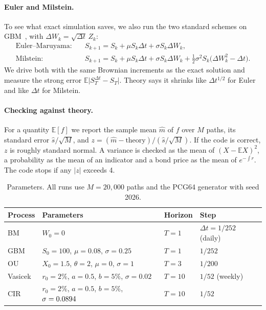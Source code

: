 \documentclass[11pt]{article}
\newcommand{\E}{\mathbb{E}}
\begin{document}
\paragraph{Euler and Milstein.} To see what exact simulation saves, we also run the two standard
schemes on GBM~\cite{kloeden1992,higham2001}, with $\Delta W_k=\sqrt{\Delta t}\,Z_k$:
\begin{align}
\text{Euler--Maruyama:}\quad & S_{k+1}=S_k+\mu S_k\Delta t+\sigma S_k\Delta W_k, \\
\text{Milstein:}\quad & S_{k+1}=S_k+\mu S_k\Delta t+\sigma S_k\Delta W_k
   +\tfrac12\sigma^2S_k\big(\Delta W_k^2-\Delta t\big).
\end{align}
We drive both with the same Brownian increments as the exact solution and measure the strong
error $\E\big|S_T^{\Delta t}-S_T\big|$. Theory says it shrinks like $\Delta t^{1/2}$ for Euler and
like $\Delta t$ for Milstein.

\paragraph{Checking against theory.} For a quantity $\E[f]$ we report the sample mean
$\hat m$ of $f$ over $M$ paths, its standard error $\hat s/\sqrt M$, and
$z=(\hat m-\text{theory})/(\hat s/\sqrt M)$. If the code is correct, $z$ is roughly standard
normal. A variance is checked as the mean of $(X-\E X)^2$, a probability as the mean of an
indicator and a bond price as the mean of $e^{-\int r}$. The code stops if any $|z|$ exceeds 4.

\begin{table}[h]
\centering\small
\caption{Parameters. All runs use $M=20{,}000$ paths and the PCG64 generator with seed 2026.}
\label{tab:params}
\begin{tabular}{@{}llll@{}}
\toprule
Process & Parameters & Horizon & Step \\
\midrule
BM      & $W_0=0$                                                   & $T=1$  & $\Delta t=1/252$ (daily) \\
GBM     & $S_0=100$, $\mu=0.08$, $\sigma=0.25$                      & $T=1$  & $1/252$ \\
OU      & $X_0=1.5$, $\theta=2$, $\mu=0$, $\sigma=1$                & $T=3$  & $1/200$ \\
Vasicek & $r_0=2\%$, $a=0.5$, $b=5\%$, $\sigma=0.02$                & $T=10$ & $1/52$ (weekly) \\
CIR     & $r_0=2\%$, $a=0.5$, $b=5\%$, $\sigma=0.0894$            & $T=10$ & $1/52$ \\
\bottomrule
\end{tabular}
\end{table}
\end{document}
